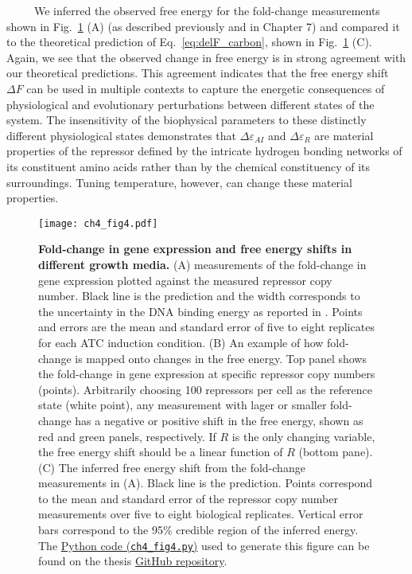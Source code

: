 \documentclass[12pt]{caltech_thesis}
\begin{document}
~~~~~We inferred the observed free energy for the fold-change
measurements shown in Fig.~\ref{fig:carbon_quality_delF} (A) (as
described previously \autocite{chure2019} and in Chapter 7) and compared
it to the theoretical prediction of Eq.~\ref{eq:delF_carbon}, shown in
Fig.~\ref{fig:carbon_quality_delF} (C). Again, we see that the observed
change in free energy is in strong agreement with our theoretical
predictions. This agreement indicates that the free energy shift
\(\Delta F\) can be used in multiple contexts to capture the energetic
consequences of physiological and evolutionary perturbations between
different states of the system. The insensitivity of the biophysical
parameters to these distinctly different physiological states
demonstrates that \(\Delta\varepsilon_{AI}\) and
\(\Delta\varepsilon_{R}\) are material properties of the repressor
defined by the intricate hydrogen bonding networks of its constituent
amino acids rather than by the chemical constituency of its
surroundings. Tuning temperature, however, can change these material
properties.

\hypertarget{fig:carbon_quality_delF}{%
\begin{figure}
\centering
\texttt{[image: ch4\_fig4.pdf]}
\caption[{Fold-change in gene expression and free energy shifts in
different growth media.}]{\textbf{Fold-change in gene expression and
free energy shifts in different growth media.} (A) measurements of the
fold-change in gene expression plotted against the measured repressor
copy number. Black line is the prediction and the width corresponds to
the uncertainty in the DNA binding energy as reported in
\textcite{garcia2011}. Points and errors are the mean and standard error
of five to eight replicates for each ATC induction condition. (B) An
example of how fold-change is mapped onto changes in the free energy.
Top panel shows the fold-change in gene expression at specific repressor
copy numbers (points). Arbitrarily choosing 100 repressors per cell as
the reference state (white point), any measurement with lager or smaller
fold-change has a negative or positive shift in the free energy, shown
as red and green panels, respectively. If \(R\) is the only changing
variable, the free energy shift should be a linear function of \(R\)
(bottom pane). (C) The inferred free energy shift from the fold-change
measurements in (A). Black line is the prediction. Points correspond to
the mean and standard error of the repressor copy number measurements
over five to eight biological replicates. Vertical error bars correspond
to the 95\% credible region of the inferred energy. The
\href{https://github.com/gchure/phd/blob/master/src/chapter_04/code/ch4_fig4.py}{Python
code (\texttt{ch4\_fig4.py})} used to generate this figure can be found
on the thesis \href{https://github.com/gchure/phd}{GitHub repository}.}
\label{fig:carbon_quality_delF}
\end{figure}
}
\end{document}
